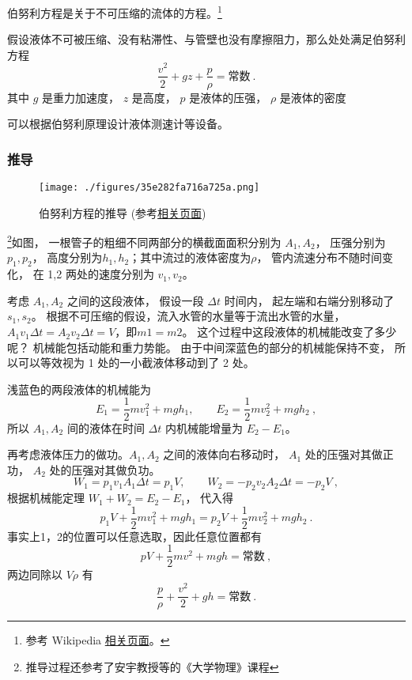 

伯努利方程是关于不可压缩的流体的方程。\footnote{参考 Wikipedia \href{https://en.wikipedia.org/wiki/Bernoulli-principle}{相关页面}。}

假设液体不可被压缩、没有粘滞性、与管壁也没有摩擦阻力，那么处处满足伯努利方程
\begin{equation}
\frac{v^2}{2} + gz + \frac{p}{\rho} = \text{常数}~.
\end{equation}
其中 $g$ 是重力加速度， $z$ 是高度， $p$ 是液体的压强， $\rho$ 是液体的密度

可以根据伯努利原理设计液体测速计等设备。

\subsubsection{推导}

\begin{figure}[ht]
\centering
\texttt{[image: ./figures/35e282fa716a725a.png]}
\caption{伯努利方程的推导 (参考\href{https://en.wikipedia.org/wiki/Bernoulli-principle}{相关页面})}\label{fig_Bernul_1}
\end{figure}
\footnote{推导过程还参考了安宇教授等的《大学物理》课程}如图， 一根管子的粗细不同两部分的横截面面积分别为 $A_1, A_2$， 压强分别为 $p_1, p_2$， 高度分别为$h_1, h_2$；其中流过的液体密度为$\rho$， 管内流速分布不随时间变化， 在  1,2 两处的速度分别为 $v_1, v_2$。

考虑 $A_1, A_2$ 之间的这段液体， 假设一段 $\Delta t$ 时间内， 起左端和右端分别移动了 $s_1, s_2$。
根据不可压缩的假设，流入水管的水量等于流出水管的水量，$A_1v_1\Delta t=A_2v_2\Delta t=V$，即$m1=m2$。 这个过程中这段液体的机械能改变了多少呢？ 机械能包括动能和重力势能。 由于中间深蓝色的部分的机械能保持不变， 所以可以等效视为 1 处的一小截液体移动到了 2 处。

浅蓝色的两段液体的机械能为
\begin{equation}
E_1=\frac{1}{2}mv_1^2+mgh_1, \qquad
E_2=\frac{1}{2}mv_2^2+mgh_2~,
\end{equation}
所以 $A_1,A_2$ 间的液体在时间 $\Delta t$ 内机械能增量为 $E_2 - E_1$。

再考虑液体压力的做功。$A_1,A_2$ 之间的液体向右移动时， $A_1$ 处的压强对其做正功， $A_2$ 处的压强对其做负功。
\begin{equation}
W_1=p_1v_1A_1\Delta t=p_1V, \qquad
W_2=-p_2v_2A_2 \Delta t=-p_2V ~,
\end{equation}
根据机械能定理 $W_1 + W_2 = E_2 - E_1$， 代入得
\begin{equation}
p_1V+\frac{1}{2}mv_1^2+mgh_1=p_2V+\frac{1}{2}mv_2^2+mgh_2~.
\end{equation}
事实上1，2的位置可以任意选取，因此任意位置都有
\begin{equation}
pV+\frac{1}{2}mv^2+mgh=\text{常数}~,
\end{equation}
两边同除以 $V\rho$ 有
\begin{equation}
\frac{p}{\rho} + \frac{v^2}{2} + gh = \text{常数}~.
\end{equation}

